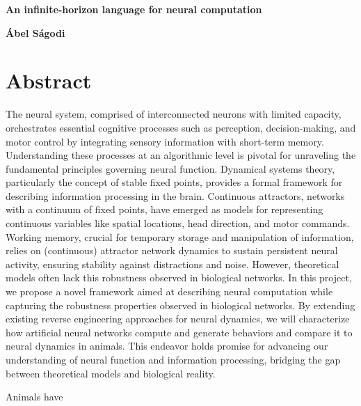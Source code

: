 \documentclass[12pt,letterpaper, onecolumn]{article}
\theoremstyle{definition}
\theoremstyle{remark}
\begin{document}

\begin{center}
\LARGE{\bf An infinite-horizon language for neural computation}
\end{center}
\begin{center}
{\textbf{\'Abel S\'agodi}}
\end{center}

\section*{Abstract}
The neural system, comprised of interconnected neurons with limited capacity, orchestrates essential cognitive processes such as perception, decision-making, and motor control by integrating sensory information with short-term memory. Understanding these processes at an algorithmic level is pivotal for unraveling the fundamental principles governing neural function. Dynamical systems theory, particularly the concept of stable fixed points, provides a formal framework for describing information processing in the brain. Continuous attractors, networks with a continuum of fixed points, have emerged as models for representing continuous variables like spatial locations, head direction, and motor commands. 
Working memory, crucial for temporary storage and manipulation of information, relies on (continuous) attractor network dynamics to sustain persistent neural activity, ensuring stability against distractions and noise. However, theoretical models often lack this robustness observed in biological networks.
In this project, we propose a novel framework aimed at describing neural computation while capturing the robustness properties observed in biological networks. By extending existing reverse engineering approaches for neural dynamics, we will characterize how artificial neural networks compute and generate behaviors and compare it to neural dynamics in animals. This endeavor holds promise for advancing our understanding of neural function and information processing, bridging the gap between theoretical models and biological reality.

Animals have 

\newpage
\end{document}
